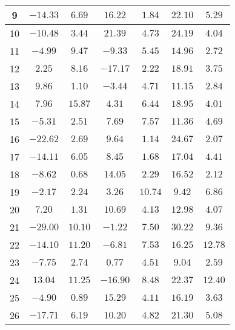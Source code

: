\begin{table}[H]
\begin{tabular}{|c|c|c|c|c|c|c|}
                    9      & $-14.33$    &$6.69$   &  $16.22$  & $1.84$   & $22.10$  & $5.29$  \\ \hline
                    10     & $-10.48$    &$3.44$   &  $21.39$  & $4.73$   & $24.19$  & $4.04$  \\ \hline
                    11     & $-4.99$     &$9.47$   &  $-9.33$  & $5.45$   & $14.96$  & $2.72$  \\ \hline
                    12     & $2.25$      &$8.16$   &  $-17.17$ &  $2.22$  & $18.91$  & $3.75$  \\ \hline
                    13     & $9.86$      &$1.10$   &  $-3.44$  & $4.71$   & $11.15$  & $2.84$  \\ \hline
                    14     & $7.96$      &$15.87$  &  $4.31$   & $6.44$   & $18.95$  & $4.01$  \\ \hline
                    15     & $-5.31$     &$2.51$   &  $7.69$   & $7.57$   & $11.36$  & $4.69$  \\ \hline
                    16     & $-22.62$    &$2.69$   &  $9.64$   & $1.14$   & $24.67$  & $2.07$  \\ \hline
                    17     & $-14.11$    &$6.05$   &  $8.45$   & $1.68$   & $17.04$  & $4.41$  \\ \hline
                    18     & $-8.62$     &$0.68$   &  $14.05$  & $2.29$   & $16.52$  & $2.12$  \\ \hline
                    19     & $-2.17$     &$2.24$   &  $3.26$   & $10.74$  & $9.42$   & $6.86$  \\ \hline
                    20     & $7.20$      &$1.31$   &  $10.69$  & $4.13$   & $12.98$  & $4.07$  \\ \hline
                    21     & $-29.00$    &$10.10$  &  $-1.22$  & $7.50$   & $30.22$  & $9.36$  \\ \hline
                    22     & $-14.10$    &$11.20$  &  $-6.81$  & $7.53$   & $16.25$  & $12.78$ \\ \hline
                    23     & $-7.75$     &$2.74$   &  $0.77$   & $4.51$   & $9.04$   & $2.59$  \\ \hline
                    24     & $13.04$     &$11.25$  &  $-16.90$ & $8.48$   & $22.37$  & $12.40$ \\ \hline
                    25     & $-4.90$     &$0.89$   &  $15.29$  & $4.11$   & $16.19$  & $3.63$  \\ \hline
                    26     & $-17.71$    &$6.19$   &  $10.20$  & $4.82$   & $21.30$  & $5.08$  \\ \hline

\end{tabular}
\end{table}
